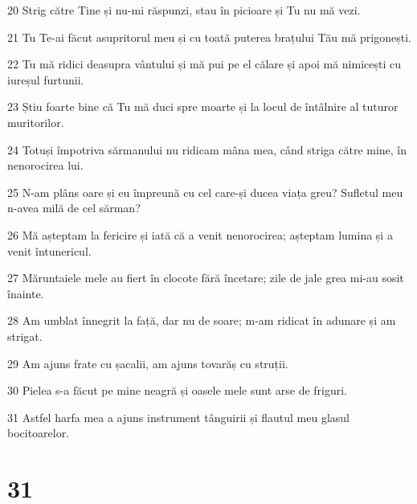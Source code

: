 \par 20 Strig către Tine și nu-mi răspunzi, stau în picioare și Tu nu mă vezi.
\par 21 Tu Te-ai făcut asupritorul meu și cu toată puterea brațului Tău mă prigonești.
\par 22 Tu mă ridici deasupra vântului și mă pui pe el călare și apoi mă nimicești cu iureșul furtunii.
\par 23 Știu foarte bine că Tu mă duci spre moarte și la locul de întâlnire al tuturor muritorilor.
\par 24 Totuși împotriva sărmanului nu ridicam mâna mea, când striga către mine, în nenorocirea lui.
\par 25 N-am plâns oare și eu împreună cu cel care-și ducea viața greu? Sufletul meu n-avea milă de cel sărman?
\par 26 Mă așteptam la fericire și iată că a venit nenorocirea; așteptam lumina și a venit întunericul.
\par 27 Măruntaiele mele au fiert în clocote fără încetare; zile de jale grea mi-au sosit înainte.
\par 28 Am umblat înnegrit la față, dar nu de soare; m-am ridicat în adunare și am strigat.
\par 29 Am ajuns frate cu șacalii, am ajuns tovarăș cu struții.
\par 30 Pielea s-a făcut pe mine neagră și oasele mele sunt arse de friguri.
\par 31 Astfel harfa mea a ajuns instrument tânguirii și flautul meu glasul bocitoarelor.

\chapter{31}

